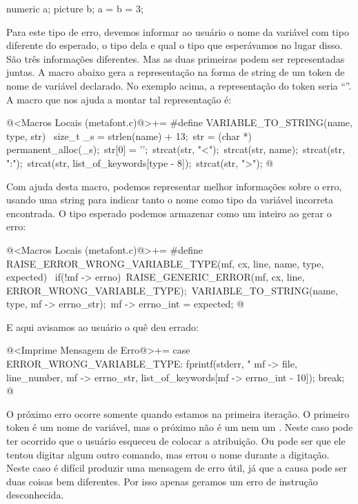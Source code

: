 \alinhaverbatim
numeric a;
picture b;
a = b = 3; %
\alinhanormal

Para este tipo de erro, devemos informar ao usuário o nome da variável
com tipo diferente do esperado, o tipo dela e qual o tipo que
esperávamos no lugar disso. São três informações diferentes. Mas as
duas primeiras podem ser representadas juntas. A macro abaixo gera a
representação na forma de string de um token de nome de variável
declarado. No exemplo acima, a representação do token 
seria ``''. A macro que nos ajuda a montar tal
representação é:

\iniciocodigo
@<Macros Locais (metafont.c)@>+=
#define VARIABLE_TO_STRING(name, type, str) {\
  size_t _s = strlen(name) + 13;\
  str = (char *) permanent_alloc(_s);\
  str[0] = '\0';\
  strcat(str, "<");\
  strcat(str, name);\
  strcat(str, ":");\
  strcat(str, list_of_keywords[type - 8]);\
  strcat(str, ">");}
@
\fimcodigo

Com ajuda desta macro, podemos representar melhor informações sobre o
erro, usando uma string para indicar tanto o nome como tipo da
variável incorreta encontrada. O tipo esperado podemos armazenar como
um inteiro ao gerar o erro:

\iniciocodigo
@<Macros Locais (metafont.c)@>+=
#define RAISE_ERROR_WRONG_VARIABLE_TYPE(mf, cx, line, name, type, expected) {\
  if(!mf -> errno){\
    RAISE_GENERIC_ERROR(mf, cx, line, ERROR_WRONG_VARIABLE_TYPE);\
    VARIABLE_TO_STRING(name, type, mf -> errno_str);\
    mf -> errno_int = expected;}}
@
\fimcodigo

E aqui avisamos ao usuário o quê deu errado:

\iniciocodigo
@<Imprime Mensagem de Erro@>+=
case ERROR_WRONG_VARIABLE_TYPE:
  fprintf(stderr, "%
          mf -> file, line_number, mf -> errno_str,
          list_of_keywords[mf -> errno_int - 10]);
  break;
@
\fimcodigo

O próximo erro ocorre somente quando estamos na primeira iteração. O
primeiro token é um nome de variável, mas o próximo não é
um \monoespaco{=} nem um \monoespaco{:=}. Neste caso pode ter ocorrido
que o usuário esqueceu de colocar a atribuição. Ou pode ser que ele
tentou digitar algum outro comando, mas errou o nome durante a
digitação. Neste caso é difícil produzir uma mensagem de erro útil, já
que a causa pode ser duas coisas bem diferentes. Por isso apenas
geramos um erro de instrução desconhecida.

